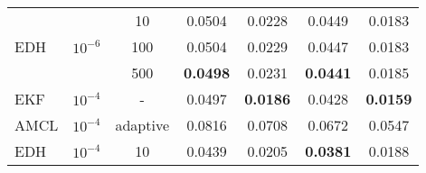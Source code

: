 \begin{table}[]
\begin{tabular}{lllllll}
        \multicolumn{1}{|l|}{\multirow{3}{*}{EDH}}       & \multicolumn{1}{c|}{\multirow{3}{*}{$10^{-6}$}}                 & \multicolumn{1}{c|}{10}                                         & \multicolumn{1}{c|}{0.0504}                    & \multicolumn{1}{c|}{0.0228}                    & \multicolumn{1}{c|}{0.0449}                    & \multicolumn{1}{c|}{0.0183}                     \\ \cline{3-7}
        \multicolumn{1}{|l|}{}                           & \multicolumn{1}{c|}{}                                           & \multicolumn{1}{c|}{100}                                        & \multicolumn{1}{c|}{0.0504}                    & \multicolumn{1}{c|}{0.0229}                    & \multicolumn{1}{c|}{0.0447}                    & \multicolumn{1}{c|}{0.0183}                     \\ \cline{3-7}
        \multicolumn{1}{|l|}{}                           & \multicolumn{1}{c|}{}                                           & \multicolumn{1}{c|}{500}                                        & \multicolumn{1}{c|}{\textbf{0.0498}}           & \multicolumn{1}{c|}{0.0231}                    & \multicolumn{1}{c|}{\textbf{0.0441}}           & \multicolumn{1}{c|}{0.0185}                     \\ \hline
        \hline
        \multicolumn{1}{|l|}{EKF}                        & \multicolumn{1}{c|}{$10^{-4}$}                                  & \multicolumn{1}{c|}{-}                                          & \multicolumn{1}{c|}{0.0497}                    & \multicolumn{1}{c|}{\textbf{0.0186}}           & \multicolumn{1}{c|}{0.0428}                    & \multicolumn{1}{c|}{\textbf{0.0159}}            \\ \hline
        \multicolumn{1}{|l|}{AMCL}                       & \multicolumn{1}{c|}{$10^{-4}$}                                  & \multicolumn{1}{c|}{adaptive}                                   & \multicolumn{1}{c|}{0.0816}                    & \multicolumn{1}{c|}{0.0708}                    & \multicolumn{1}{c|}{0.0672}                    & \multicolumn{1}{c|}{0.0547}                     \\ \hline
        \multicolumn{1}{|l|}{\multirow{3}{*}{EDH}}       & \multicolumn{1}{c|}{\multirow{3}{*}{$10^{-4}$}}                 & \multicolumn{1}{c|}{10}                                         & \multicolumn{1}{c|}{0.0439}                    & \multicolumn{1}{c|}{0.0205}                    & \multicolumn{1}{c|}{\textbf{0.0381}}           & \multicolumn{1}{c|}{0.0188}                     \\ \cline{3-7}

\end{tabular}
\end{table}
